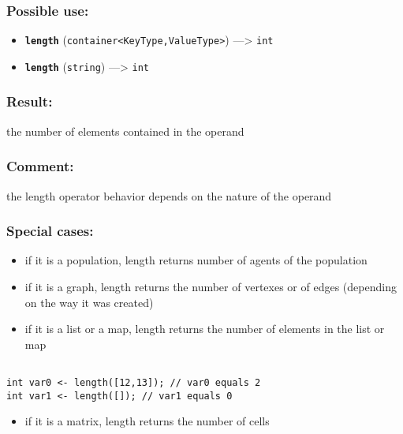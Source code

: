 \documentclass[]{book}
\providecommand{\tightlist}{%
  \setlength{\itemsep}{0pt}\setlength{\parskip}{0pt}}
\theoremstyle{definition}
\theoremstyle{definition}
\theoremstyle{definition}
\theoremstyle{remark}
\begin{document}
\subsubsection{Possible use:}\label{possible-use-320}

\begin{itemize}
\tightlist
\item
  \textbf{\texttt{length}}
  (\texttt{container\textless{}KeyType,ValueType\textgreater{}})
  ---\textgreater{} \texttt{int}
\item
  \textbf{\texttt{length}} (\texttt{string}) ---\textgreater{}
  \texttt{int}
\end{itemize}

\subsubsection{Result:}\label{result-310}

the number of elements contained in the operand

\subsubsection{Comment:}\label{comment-59}

the length operator behavior depends on the nature of the operand

\subsubsection{Special cases:}\label{special-cases-87}

\begin{itemize}
\tightlist
\item
  if it is a population, length returns number of agents of the
  population\\
\item
  if it is a graph, length returns the number of vertexes or of edges
  (depending on the way it was created)\\
\item
  if it is a list or a map, length returns the number of elements in the
  list or map
\end{itemize}

\begin{verbatim}
 
int var0 <- length([12,13]); // var0 equals 2 
int var1 <- length([]); // var1 equals 0
\end{verbatim}

\begin{itemize}
\tightlist
\item
  if it is a matrix, length returns the number of cells
\end{itemize}
\end{document}
